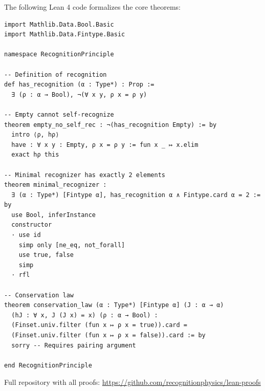 \documentclass[12pt,a4paper]{article}
\begin{document}
The following Lean 4 code formalizes the core theorems:

\begin{verbatim}
import Mathlib.Data.Bool.Basic
import Mathlib.Data.Fintype.Basic

namespace RecognitionPrinciple

-- Definition of recognition
def has_recognition (α : Type*) : Prop :=
  ∃ (ρ : α → Bool), ¬(∀ x y, ρ x = ρ y)

-- Empty cannot self-recognize
theorem empty_no_self_rec : ¬(has_recognition Empty) := by
  intro ⟨ρ, hρ⟩
  have : ∀ x y : Empty, ρ x = ρ y := fun x _ ↦ x.elim
  exact hρ this

-- Minimal recognizer has exactly 2 elements
theorem minimal_recognizer : 
  ∃ (α : Type*) [Fintype α], has_recognition α ∧ Fintype.card α = 2 := by
  use Bool, inferInstance
  constructor
  · use id
    simp only [ne_eq, not_forall]
    use true, false
    simp
  · rfl

-- Conservation law
theorem conservation_law (α : Type*) [Fintype α] (J : α → α) 
  (hJ : ∀ x, J (J x) = x) (ρ : α → Bool) :
  (Finset.univ.filter (fun x ↦ ρ x = true)).card = 
  (Finset.univ.filter (fun x ↦ ρ x = false)).card := by
  sorry -- Requires pairing argument

end RecognitionPrinciple
\end{verbatim}

Full repository with all proofs: \url{https://github.com/recognitionphysics/lean-proofs}
\end{document}
